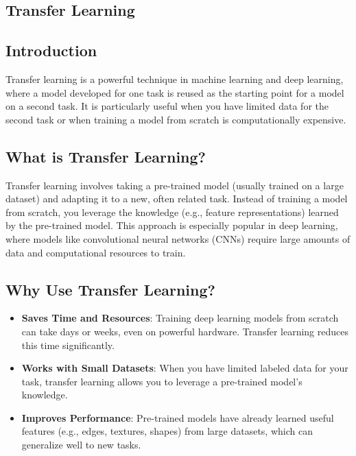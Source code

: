 \begin{notechapter}
\chapter{Transfer Learning}\label{ch:transfer-learning}

\section{Introduction}
Transfer learning is a powerful technique in machine learning and
deep learning, where a model developed for one task is reused as
the starting point for a model on a second task. It is particularly
useful when you have limited data for the second task or when
training a model from scratch is computationally expensive.

\section{What is Transfer Learning?}
Transfer learning involves taking a pre-trained model (usually
trained on a large dataset) and adapting it to a new, often related
task. Instead of training a model from scratch, you leverage the
knowledge (e.g., feature representations) learned by the pre-trained
model. This approach is especially popular in deep learning, where
models like convolutional neural networks (CNNs) require large
amounts of data and computational resources to train.

\section{Why Use Transfer Learning?}
\begin{itemize}
    \item \textbf{Saves Time and Resources}: Training deep learning
          models from scratch can take days or weeks, even on powerful
          hardware. Transfer learning reduces this time significantly.
    \item \textbf{Works with Small Datasets}: When you have limited
          labeled data for your task, transfer learning allows you to
          leverage a pre-trained model's knowledge.
    \item \textbf{Improves Performance}: Pre-trained models have already
          learned useful features (e.g., edges, textures, shapes) from
          large datasets, which can generalize well to new tasks.
\end{itemize}


\end{notechapter}
